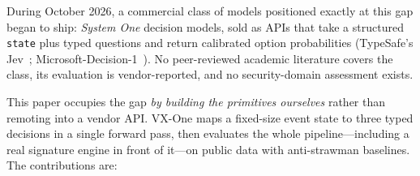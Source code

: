 \documentclass[sigconf,anonymous=false]{acmart}
\begin{document}
During October 2026, a commercial class of models positioned exactly at this gap began to ship: \emph{System One} decision models, sold as APIs that take a structured \texttt{state} plus typed questions and return calibrated option probabilities (TypeSafe's Jev~\cite{jevdocs,typesafejev}; Microsoft-Decision-1~\cite{msdecision1,mslearn-decision1}). No peer-reviewed academic literature covers the class, its evaluation is vendor-reported, and no security-domain assessment exists.

This paper occupies the gap \emph{by building the primitives ourselves} rather than remoting into a vendor API. VX-One maps a fixed-size event state to three typed decisions in a single forward pass, then evaluates the whole pipeline---including a real signature engine in front of it---on public data with anti-strawman baselines. The contributions are:
\end{document}
